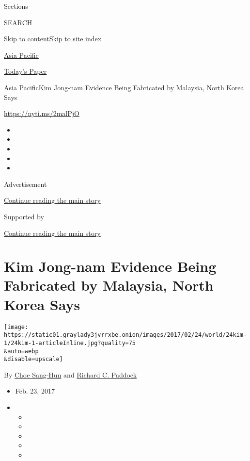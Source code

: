 Sections

SEARCH

\protect\hyperlink{site-content}{Skip to
content}\protect\hyperlink{site-index}{Skip to site index}

\href{https://www.nytimes3xbfgragh.onion/section/world/asia}{Asia
Pacific}

\href{https://myaccount.nytimes3xbfgragh.onion/auth/login?response_type=cookie\&client_id=vi}{}

\href{https://www.nytimes3xbfgragh.onion/section/todayspaper}{Today's
Paper}

\href{/section/world/asia}{Asia Pacific}\textbar{}Kim Jong-nam Evidence
Being Fabricated by Malaysia, North Korea Says

\url{https://nyti.ms/2malPjO}

\begin{itemize}
\item
\item
\item
\item
\item
\end{itemize}

Advertisement

\protect\hyperlink{after-top}{Continue reading the main story}

Supported by

\protect\hyperlink{after-sponsor}{Continue reading the main story}

\hypertarget{kim-jong-nam-evidence-being-fabricated-by-malaysia-north-korea-says}{%
\section{Kim Jong-nam Evidence Being Fabricated by Malaysia, North Korea
Says}\label{kim-jong-nam-evidence-being-fabricated-by-malaysia-north-korea-says}}

\texttt{[image: https://static01.graylady3jvrrxbe.onion/images/2017/02/24/world/24kim-1/24kim-1-articleInline.jpg?quality=75\\\&auto=webp\\\&disable=upscale]}

By \href{http://www.nytimes3xbfgragh.onion/by/choe-sang-hun}{Choe
Sang-Hun} and
\href{https://www.nytimes3xbfgragh.onion/by/richard-c-paddock}{Richard
C. Paddock}

\begin{itemize}
\item
  Feb. 23, 2017
\item
  \begin{itemize}
  \item
  \item
  \item
  \item
  \item
  \end{itemize}
\end{itemize}


